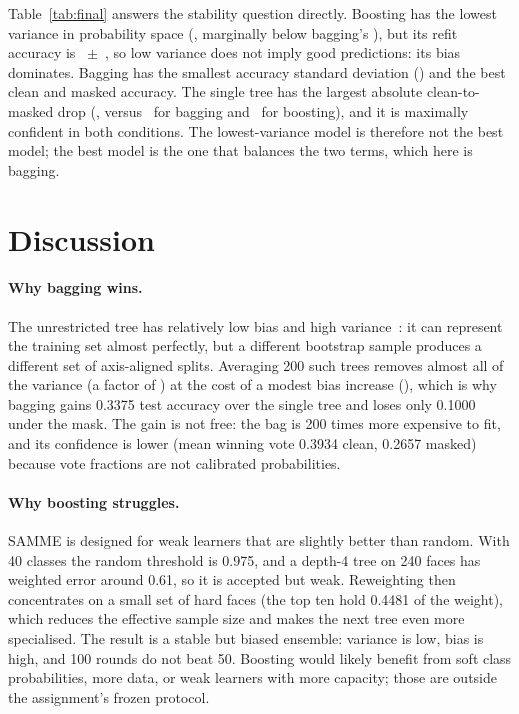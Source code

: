 \documentclass[10pt,twocolumn,letterpaper]{article}
\begin{document}
Table~\ref{tab:final} answers the stability question directly.  Boosting has
the lowest variance in probability space (\BoostVar, marginally below bagging's
\BagVar), but its refit accuracy is \BoostRefitAcc~$\pm$~\BoostRefitStd, so low
variance does not imply good predictions: its bias dominates.  Bagging has the
smallest accuracy standard deviation (\BagRefitStd) and the best clean and
masked accuracy.  The single tree has the largest absolute clean-to-masked
drop (\TreeCleanDrop, versus \BagCleanDrop~for bagging and \BoostCleanDrop~for
boosting), and it is maximally confident in both conditions.
The lowest-variance model is therefore not the best model; the best model is the
one that balances the two terms, which here is bagging.

\section{Discussion}

\paragraph{Why bagging wins.}  The unrestricted tree has relatively low bias and
high variance~\cite{dietterich2000}: it can represent the training set almost
perfectly, but a different bootstrap sample produces a different set of
axis-aligned splits.  Averaging 200 such trees removes almost all of the
variance (a factor of \BagVarRatio) at the cost of a modest bias increase
(\BagBiasDelta), which is why bagging gains 0.3375 test accuracy over the single
tree and loses only 0.1000 under the mask.  The gain is not free: the bag is 200
times more expensive to fit, and its confidence is lower (mean winning vote
0.3934 clean, 0.2657 masked) because vote fractions are not calibrated
probabilities.

\paragraph{Why boosting struggles.}  SAMME is designed for weak learners that
are slightly better than random.  With 40 classes the random threshold is 0.975,
and a depth-4 tree on 240 faces has weighted error around 0.61, so it is
accepted but weak.  Reweighting then concentrates on a small set of hard faces
(the top ten hold 0.4481 of the weight), which reduces the effective sample size
and makes the next tree even more specialised.  The result is a stable but
biased ensemble: variance is low, bias is high, and 100 rounds do not beat 50.
Boosting would likely benefit from soft class probabilities, more data, or
weak learners with more capacity; those are outside the assignment's frozen
protocol.
\end{document}
